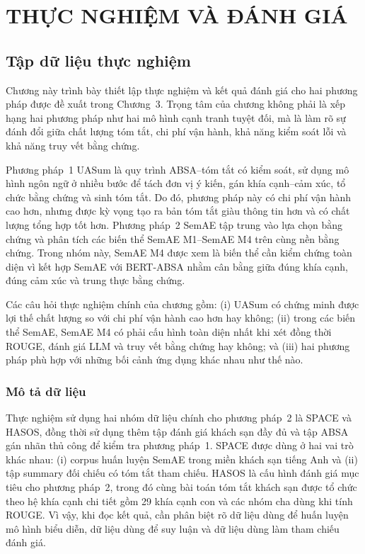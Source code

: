 \chapter{THỰC NGHIỆM VÀ ĐÁNH GIÁ}
\section{Tập dữ liệu thực nghiệm}
\label{sec:experiments-two-methods}

Chương này trình bày thiết lập thực nghiệm và kết quả đánh giá cho hai phương pháp được đề xuất trong Chương~3. Trọng tâm của chương không phải là xếp hạng hai phương pháp như hai mô hình cạnh tranh tuyệt đối, mà là làm rõ sự đánh đổi giữa chất lượng tóm tắt, chi phí vận hành, khả năng kiểm soát lỗi và khả năng truy vết bằng chứng.

Phương pháp~1 UASum là quy trình ABSA--tóm tắt có kiểm soát, sử dụng mô hình ngôn ngữ ở nhiều bước để tách đơn vị ý kiến, gán khía cạnh--cảm xúc, tổ chức bằng chứng và sinh tóm tắt. Do đó, phương pháp này có chi phí vận hành cao hơn, nhưng được kỳ vọng tạo ra bản tóm tắt giàu thông tin hơn và có chất lượng tổng hợp tốt hơn. Phương pháp~2 SemAE tập trung vào lựa chọn bằng chứng và phân tích các biến thể SemAE M1--SemAE M4 trên cùng nền bằng chứng. Trong nhóm này, SemAE M4 được xem là biến thể cần kiểm chứng toàn diện vì kết hợp SemAE với BERT-ABSA nhằm cân bằng giữa đúng khía cạnh, đúng cảm xúc và trung thực bằng chứng.

Các câu hỏi thực nghiệm chính của chương gồm: (i) UASum có chứng minh được lợi thế chất lượng so với chi phí vận hành cao hơn hay không; (ii) trong các biến thể SemAE, SemAE M4 có phải cấu hình toàn diện nhất khi xét đồng thời ROUGE, đánh giá LLM và truy vết bằng chứng hay không; và (iii) hai phương pháp phù hợp với những bối cảnh ứng dụng khác nhau như thế nào.

\subsection{Mô tả dữ liệu}


Thực nghiệm sử dụng hai nhóm dữ liệu chính cho phương pháp~2 là SPACE và HASOS, đồng thời sử dụng thêm tập đánh giá khách sạn đầy đủ và tập ABSA gán nhãn thủ công để kiểm tra phương pháp~1. SPACE được dùng ở hai vai trò khác nhau: (i) corpus huấn luyện SemAE trong miền khách sạn tiếng Anh và (ii) tập summary đối chiếu có tóm tắt tham chiếu. HASOS là cấu hình đánh giá mục tiêu cho phương pháp~2, trong đó cùng bài toán tóm tắt khách sạn được tổ chức theo hệ khía cạnh chi tiết gồm 29 khía cạnh con và các nhóm cha dùng khi tính ROUGE. Vì vậy, khi đọc kết quả, cần phân biệt rõ dữ liệu dùng để huấn luyện mô hình biểu diễn, dữ liệu dùng để suy luận và dữ liệu dùng làm tham chiếu đánh giá.


